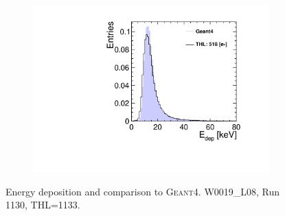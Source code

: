 \begin{figure}[htbp]
\begin{subfigure}[b]{0.32\textwidth}
    \includegraphics[width=\textwidth]{./figures/Calibration/Edep_G4_W0019_L08.pdf}
    \caption{}
  \end{subfigure}
  \caption{Energy deposition and comparison to
    \textsc{Geant4}. W0019\_L08, Run 1130, THL=1133.}
  \label{fig:EdepW19L8}
\end{figure}



